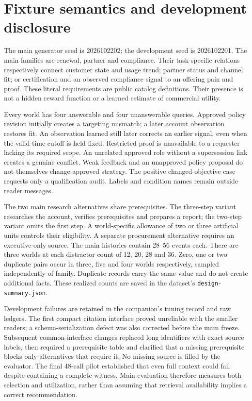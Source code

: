 \section{Fixture semantics and development disclosure}
The main generator seed is 2026102202; the development seed is 2026102201. The main families are renewal, partner and compliance. Their task-specific relations respectively connect customer state and usage trend; partner status and channel fit; or certification and an observed compliance signal to an offering pain and proof. These literal requirements are public catalog definitions. Their presence is not a hidden reward function or a learned estimate of commercial utility.

Every world has four answerable and four unanswerable queries. Approved policy revision initially creates a targeting mismatch; a later account observation restores fit. An observation learned still later corrects an earlier signal, even when the valid-time cutoff is held fixed. Restricted proof is unavailable to a requester lacking its required scope. An unrelated approved role without a supersession link creates a genuine conflict. Weak feedback and an unapproved policy proposal do not themselves change approved strategy. The positive changed-objective case requests only a qualification audit. Labels and condition names remain outside reader messages.

The two main research alternatives share prerequisites. The three-step variant researches the account, verifies prerequisites and prepares a report; the two-step variant omits the first step. A world-specific allowance of two or three artificial units controls their eligibility. A separate procurement alternative requires an executive-only source. The main histories contain 28--56 events each. There are three worlds at each distractor count of 12, 20, 28 and 36. Zero, one or two duplicate pairs occur in three, five and four worlds respectively, sampled independently of family. Duplicate records carry the same value and do not create additional facts. These realized counts are saved in the dataset's \texttt{design-summary.json}.

Development failures are retained in the companion's tuning record and raw ledgers. The first compact citation interface proved unreliable with the smaller readers; a schema-serialization defect was also corrected before the main freeze. Subsequent common-interface changes replaced long identifiers with exact source labels, then required a prerequisite table and clarified that a missing prerequisite blocks only alternatives that require it. No missing source is filled by the evaluator. The final 48-call pilot established that even full context could fail despite containing a complete witness. Main evaluation therefore measures both selection and utilization, rather than assuming that retrieval availability implies a correct recommendation.


